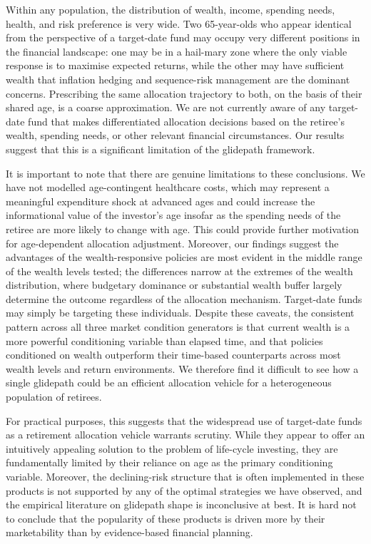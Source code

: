 \documentclass[11pt]{article}
\begin{document}
Within any population, the distribution of wealth, income, spending needs, health, and risk preference is very wide. Two 65-year-olds who appear identical from the perspective of a target-date fund may occupy very different positions in the financial landscape: one may be in a hail-mary zone where the only viable response is to maximise expected returns, while the other may have sufficient wealth that inflation hedging and sequence-risk management are the dominant concerns. Prescribing the same allocation trajectory to both, on the basis of their shared age, is a coarse approximation. We are not currently aware of any target-date fund that makes differentiated allocation decisions based on the retiree's wealth, spending needs, or other relevant financial circumstances. Our results suggest that this is a significant limitation of the glidepath framework.

It is important to note that there are genuine limitations to these conclusions. We have not modelled age-contingent healthcare costs, which may represent a meaningful expenditure shock at advanced ages and could increase the informational value of the investor's age insofar as the spending needs of the retiree are more likely to change with age. This could provide further motivation for age-dependent allocation adjustment. Moreover, our findings suggest the advantages of the wealth-responsive policies are most evident in the middle range of the wealth levels tested; the differences narrow at the extremes of the wealth distribution, where budgetary dominance or substantial wealth buffer largely determine the outcome regardless of the allocation mechanism. Target-date funds may simply be targeting these individuals. Despite these caveats, the consistent pattern across all three market condition generators is that current wealth is a more powerful conditioning variable than elapsed time, and that policies conditioned on wealth outperform their time-based counterparts across most wealth levels and return environments. We therefore find it difficult to see how a single glidepath could be an efficient allocation vehicle for a heterogeneous population of retirees.

For practical purposes, this suggests that the widespread use of target-date funds as a retirement allocation vehicle warrants scrutiny. While they appear to offer an intuitively appealing solution to the problem of life-cycle investing, they are fundamentally limited by their reliance on age as the primary conditioning variable. Moreover, the declining-risk structure that is often implemented in these products is not supported by any of the optimal strategies we have observed, and the empirical literature on glidepath shape is inconclusive at best. It is hard not to conclude that the popularity of these products is driven more by their marketability than by evidence-based financial planning.
\end{document}
